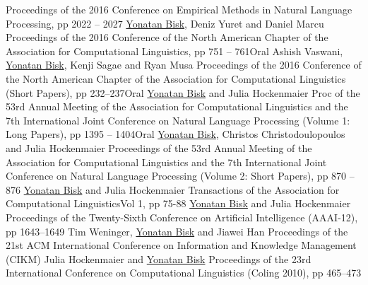 \documentclass[10pt,letter]{moderncv}
\newcommand{\YB}{\underline{Yonatan Bisk}}
\begin{document}
  {Proceedings of the 2016 Conference on Empirical Methods in Natural Language Processing, pp 2022 -- 2027}{}{}
\pub{--}
  {\href{http://yonatanbisk.com/papers/2016-NAACL.pdf}{\color{linkcolor}{Natural Language Communication with Robots}}}
  {\YB{}, Deniz Yuret and Daniel Marcu}
  {Proceedings of the 2016 Conference of the North American Chapter of the Association for Computational Linguistics, pp 751 -- 761}{Oral}{}
\pub{--}
  {\href{http://yonatanbisk.com/papers/2016-NAACLShort.pdf}{\color{linkcolor}{Supertagging With LSTMs}}}
  {Ashish Vaswani, \YB, Kenji Sagae and Ryan Musa}
  {Proceedings of the 2016 Conference of the North American Chapter of the Association for Computational Linguistics (Short Papers), pp 232--237}{Oral}{}
  {\href{http://yonatanbisk.com/papers/2015-ACL.pdf}{\color{linkcolor}{Probing the Linguistic Strengths and Limitations of Unsupervised Grammar Induction}}}
  {\YB{} and Julia Hockenmaier}
  {Proc of the 53rd Annual Meeting of the Association for Computational Linguistics and the 7th International Joint Conference on Natural Language Processing (Volume 1: Long Papers), pp 1395 -- 1404}{Oral}{}
\pub{--}
  {\href{http://yonatanbisk.com/papers/2015-ACLShort-Fixed.pdf}{\color{linkcolor}{Labeled Grammar Induction with Minimal Supervision}}}
  {\YB, Christos Christodoulopoulos and Julia Hockenmaier}
  {Proceedings of the 53rd Annual Meeting of the Association for Computational Linguistics and the 7th International Joint Conference on Natural Language Processing (Volume 2: Short Papers), pp 870 -- 876 }{}{}
  {\href{http://yonatanbisk.com/papers/2013-TACL.pdf}{\color{linkcolor}{An HDP Model for Inducing Combinatory Categorial Grammars}}}
  {\YB{} and Julia Hockenmaier}
  {Transactions of the Association for Computational Linguistics}{Vol 1, pp 75-88}{}
  {\href{http://yonatanbisk.com/papers/2012-AAAI.pdf}{\color{linkcolor}{Simple Robust Grammar Induction with Combinatory Categorial Grammars}}}
  {\YB{} and Julia Hockenmaier}
  {Proceedings of the Twenty-Sixth Conference on Artificial Intelligence (AAAI-12), pp 1643--1649}{}{}
\pub{--}
  {\href{http://yonatanbisk.com/papers/2012-CIKM.pdf}{\color{linkcolor}{Document-Topic Hierarchies from Document Graphs}}}
  {Tim Weninger, \YB{} and Jiawei Han}
  {Proceedings of the 21st ACM International Conference on Information and Knowledge Management (CIKM)}{}{}
  {\href{http://yonatanbisk.com/papers/2010-COLING.pdf}{\color{linkcolor}{Normal-form parsing for Combinatory Categorial Grammars with generalized composition and type-raising}}}
  {Julia Hockenmaier and \YB{}}
  {Proceedings of the 23rd International Conference on Computational Linguistics (Coling 2010), pp 465--473}{}{}
\end{document}
